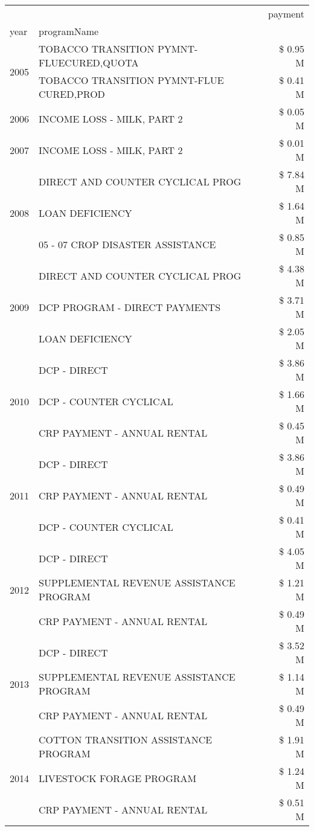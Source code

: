 \begin{tabular}{llr}
\toprule
 &  & payment \\
year & programName &  \\
\midrule
\multirow[t]{2}{*}{2005} & TOBACCO TRANSITION PYMNT-FLUECURED,QUOTA & \$ 0.95 M \\
 & TOBACCO TRANSITION PYMNT-FLUE CURED,PROD & \$ 0.41 M \\
\cline{1-3}
2006 & INCOME LOSS - MILK, PART 2 & \$ 0.05 M \\
\cline{1-3}
2007 & INCOME LOSS - MILK, PART 2 & \$ 0.01 M \\
\cline{1-3}
\multirow[t]{3}{*}{2008} & DIRECT AND COUNTER CYCLICAL PROG & \$ 7.84 M \\
 & LOAN DEFICIENCY & \$ 1.64 M \\
 & 05 - 07 CROP DISASTER ASSISTANCE & \$ 0.85 M \\
\cline{1-3}
\multirow[t]{3}{*}{2009} & DIRECT AND COUNTER CYCLICAL PROG & \$ 4.38 M \\
 & DCP PROGRAM - DIRECT PAYMENTS & \$ 3.71 M \\
 & LOAN DEFICIENCY & \$ 2.05 M \\
\cline{1-3}
\multirow[t]{3}{*}{2010} & DCP - DIRECT & \$ 3.86 M \\
 & DCP - COUNTER CYCLICAL & \$ 1.66 M \\
 & CRP PAYMENT - ANNUAL RENTAL & \$ 0.45 M \\
\cline{1-3}
\multirow[t]{3}{*}{2011} & DCP - DIRECT & \$ 3.86 M \\
 & CRP PAYMENT - ANNUAL RENTAL & \$ 0.49 M \\
 & DCP - COUNTER CYCLICAL & \$ 0.41 M \\
\cline{1-3}
\multirow[t]{3}{*}{2012} & DCP - DIRECT & \$ 4.05 M \\
 & SUPPLEMENTAL REVENUE ASSISTANCE PROGRAM & \$ 1.21 M \\
 & CRP PAYMENT - ANNUAL RENTAL & \$ 0.49 M \\
\cline{1-3}
\multirow[t]{3}{*}{2013} & DCP - DIRECT & \$ 3.52 M \\
 & SUPPLEMENTAL REVENUE ASSISTANCE PROGRAM & \$ 1.14 M \\
 & CRP PAYMENT - ANNUAL RENTAL & \$ 0.49 M \\
\cline{1-3}
\multirow[t]{3}{*}{2014} & COTTON TRANSITION ASSISTANCE PROGRAM & \$ 1.91 M \\
 & LIVESTOCK FORAGE PROGRAM & \$ 1.24 M \\
 & CRP PAYMENT - ANNUAL RENTAL & \$ 0.51 M \\

\end{tabular}
